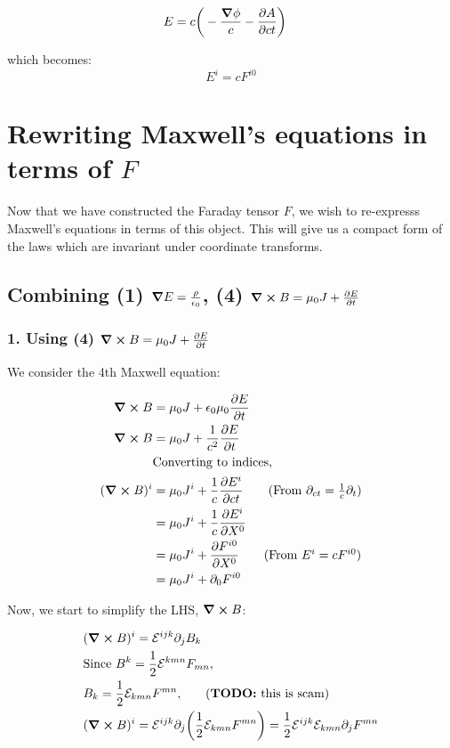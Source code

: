 \begin{align*}
    E &= c \bigg(- \frac{\grad \phi}{c}  - \pdv{A}{ct}\bigg)
\end{align*}

which becomes:
\begin{equation}
    \boxed{E^i = c F^{i0}}
\end{equation}

\section{Rewriting Maxwell's equations in terms of $F$}
Now that we have constructed the Faraday tensor $F$, we wish to re-expresss
Maxwell's equations in terms of this object. This will give us a compact
form of the laws which are invariant under coordinate transforms.

\subsection{Combining (1) $\grad E = \frac{\rho}{\epsilon_0}$, (4) $\curl B = \mu_0 J + \pdv{E}{t}$}
\subsubsection{1. Using (4) $\curl B = \mu_0 J + \pdv{E}{t}$}

We consider the 4th Maxwell equation:

\begin{align*}
    \curl B &= \mu_0 J + \epsilon_0 \mu_0 \pdv{E}{t} \\
    \curl B &= \mu_0 J + \frac{1}{c^2} \pdv{E}{t} \\
            &\text{Converting to indices,}\\
    (\curl B)^i &= \mu_0 J^i + \frac{1}{c} \pdv{E^i}{ct} \tag{From $\partial_{ct} = \frac{1}{c} \partial_t$} \\
                &= \mu_0 J^i + \frac{1}{c} \pdv{E^i}{X^0} \\
                &= \mu_0 J^i + \pdv{F^{i0}}{X^0} \tag{From $E^i = c F^{i0}$} \\
                &= \mu_0 J^i + \partial_0 F^{i0}
\end{align*}

Now, we start to simplify the LHS, $\curl B$:

\begin{align*}
    &(\curl B)^i = \levicevita^{ijk} \partial_j B_k \\
    &\text{Since $B^k = \frac{1}{2} \levicevita^{kmn} F_{mn}$,} \\
    &\text{$B_k = \frac{1}{2} \levicevita_{kmn} F^{mn}$,} \tag{\textbf{TODO:} this is scam} \\
    &(\curl B)^i = \levicevita^{ijk} \partial_j \bigg( \frac{1}{2} \levicevita_{kmn} F^{mn} \bigg) =
    \frac{1}{2} \levicevita^{ijk} \levicevita_{kmn} \partial_j F^{mn}\\
\end{align*}

